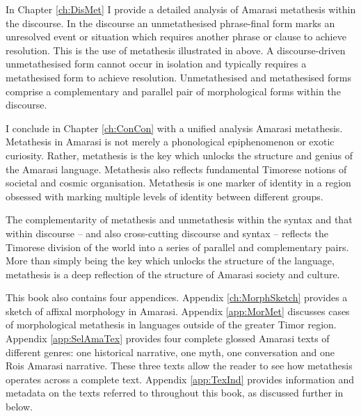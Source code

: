 In Chapter \ref{ch:DisMet} I provide a detailed analysis of Amarasi metathesis within the discourse.
In the discourse an unmetathesised phrase-final form marks an unresolved event or situation
which requires another phrase or clause to achieve resolution.
This is the use of metathesis illustrated in  above.
A discourse-driven unmetathesised form cannot occur in isolation
and typically requires a metathesised form to achieve resolution.
Unmetathesised and metathesised forms comprise a complementary and
parallel pair of morphological forms within the discourse.

I conclude in Chapter \ref{ch:ConCon} with a unified analysis Amarasi metathesis.
Metathesis in Amarasi is not merely a phonological epiphenomenon or exotic curiosity.
Rather, metathesis is the key which unlocks the structure and genius of the Amarasi language.
Metathesis also reflects fundamental Timorese notions of societal and cosmic organisation.
Metathesis is one marker of identity in a region obsessed with marking multiple
levels of identity between different groups.

The complementarity of metathesis and unmetathesis within the syntax and that within discourse
-- and also cross-cutting discourse and syntax --
reflects the Timorese division of the world into a series of parallel and complementary pairs.
More than simply being the key which unlocks the structure of the language,
metathesis is a deep reflection of the structure of Amarasi society and culture.

This book also contains four appendices.
Appendix \ref{ch:MorphSketch} provides a sketch of affixal morphology in Amarasi.
Appendix \ref{app:MorMet} discusses cases of morphological metathesis
in languages outside of the greater Timor region.
Appendix \ref{app:SelAmaTex} provides four complete
glossed Amarasi texts of different genres:
one historical narrative, one myth, one conversation
and one Ro{\Q}is Amarasi narrative.
These three texts allow the reader to see
how metathesis operates across a complete text.
Appendix \ref{app:TexInd} provides information and metadata
on the texts referred to throughout this book,
as discussed further in  below.







